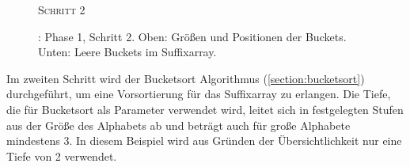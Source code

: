 \begin{figure}[ht]
    {\centering\begin{minipage}{\textwidth}
        {\large \textsc{Schritt 2}}\par\medskip
        \par\medskip
    \end{minipage}}
    \caption[\bpr: Phase 1, Schritt 2]{\bpr: Phase 1, Schritt 2. Oben: Größen und Positionen der Buckets. Unten: Leere Buckets im Suffixarray.}
    \label{bpr:p1s2}
\end{figure}
Im zweiten Schritt wird der Bucketsort Algorithmus (\cref{section:bucketsort}) durchgeführt, um eine Vorsortierung für das Suffixarray zu erlangen. Die Tiefe, die für Bucketsort als Parameter verwendet wird, leitet sich in festgelegten Stufen aus der Größe des Alphabets ab und beträgt auch für große Alphabete mindestens 3. In diesem Beispiel wird aus Gründen der Übersichtlichkeit nur eine Tiefe von 2 verwendet.\par
